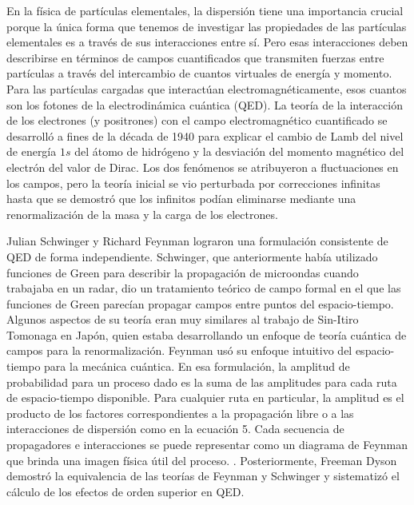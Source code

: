 En la física de partículas elementales, la dispersión tiene una importancia crucial porque la única forma que tenemos de investigar las propiedades de las partículas elementales es a través de sus interacciones entre sí. Pero esas interacciones deben describirse en términos de campos cuantificados que transmiten fuerzas entre partículas a través del intercambio de cuantos virtuales de energía y momento. Para las partículas cargadas que interactúan electromagnéticamente, esos cuantos son los fotones de la electrodinámica cuántica (QED). La teoría de la interacción de los electrones (y positrones) con el campo electromagnético cuantificado se desarrolló a fines de la década de 1940 para explicar el cambio de Lamb del nivel de energía $1s$ del átomo de hidrógeno y la desviación del momento magnético del electrón del valor de Dirac. Los dos fenómenos se atribuyeron a fluctuaciones en los campos, pero la teoría inicial se vio perturbada por correcciones infinitas hasta que se demostró que los infinitos podían eliminarse mediante una renormalización de la masa y la carga de los electrones.
\par
Julian Schwinger y Richard Feynman lograron una formulación consistente de QED de forma independiente. Schwinger, que anteriormente había utilizado funciones de Green para describir la propagación de microondas cuando trabajaba en un radar, dio un tratamiento teórico de campo formal en el que las funciones de Green parecían propagar campos entre puntos del espacio-tiempo. Algunos aspectos de su teoría eran muy similares al trabajo de Sin-Itiro Tomonaga en Japón, quien estaba desarrollando un enfoque de teoría cuántica de campos para la renormalización. Feynman usó su enfoque intuitivo del espacio-tiempo para la mecánica cuántica. En esa formulación, la amplitud de probabilidad para un proceso dado es la suma de las amplitudes para cada ruta de espacio-tiempo disponible. Para cualquier ruta en particular, la amplitud es el producto de los factores correspondientes a la propagación libre o a las interacciones de dispersión como en la ecuación 5. Cada secuencia de propagadores e interacciones se puede representar como un diagrama de Feynman que brinda una imagen física útil del proceso. . Posteriormente, Freeman Dyson demostró la equivalencia de las teorías de Feynman y Schwinger y sistematizó el cálculo de los efectos de orden superior en QED.
\par
